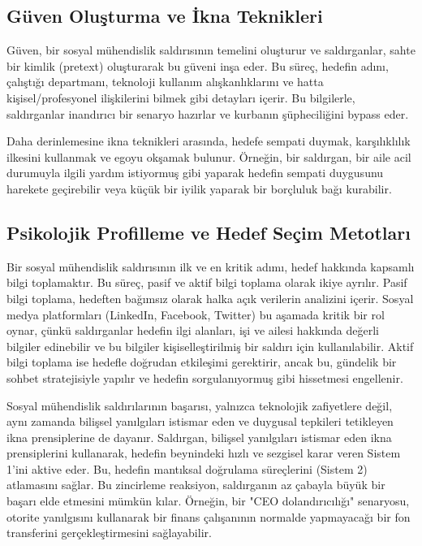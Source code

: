 \subsection{Güven Oluşturma ve İkna Teknikleri}

Güven, bir sosyal mühendislik saldırısının temelini oluşturur ve saldırganlar, sahte bir kimlik (pretext) oluşturarak bu güveni inşa eder. Bu süreç, hedefin adını, çalıştığı departmanı, teknoloji kullanım alışkanlıklarını ve hatta kişisel/profesyonel ilişkilerini bilmek gibi detayları içerir. Bu bilgilerle, saldırganlar inandırıcı bir senaryo hazırlar ve kurbanın şüpheciliğini bypass eder.

Daha derinlemesine ikna teknikleri arasında, hedefe sempati duymak, karşılıklılık ilkesini kullanmak ve egoyu okşamak bulunur. Örneğin, bir saldırgan, bir aile acil durumuyla ilgili yardım istiyormuş gibi yaparak hedefin sempati duygusunu harekete geçirebilir veya küçük bir iyilik yaparak bir borçluluk bağı kurabilir.

\subsection{Psikolojik Profilleme ve Hedef Seçim Metotları}

Bir sosyal mühendislik saldırısının ilk ve en kritik adımı, hedef hakkında kapsamlı bilgi toplamaktır. Bu süreç, pasif ve aktif bilgi toplama olarak ikiye ayrılır. Pasif bilgi toplama, hedeften bağımsız olarak halka açık verilerin analizini içerir. Sosyal medya platformları (LinkedIn, Facebook, Twitter) bu aşamada kritik bir rol oynar, çünkü saldırganlar hedefin ilgi alanları, işi ve ailesi hakkında değerli bilgiler edinebilir ve bu bilgiler kişiselleştirilmiş bir saldırı için kullanılabilir. Aktif bilgi toplama ise hedefle doğrudan etkileşimi gerektirir, ancak bu, gündelik bir sohbet stratejisiyle yapılır ve hedefin sorgulanıyormuş gibi hissetmesi engellenir.

Sosyal mühendislik saldırılarının başarısı, yalnızca teknolojik zafiyetlere değil, aynı zamanda bilişsel yanılgıları istismar eden ve duygusal tepkileri tetikleyen ikna prensiplerine de dayanır. Saldırgan, bilişsel yanılgıları istismar eden ikna prensiplerini kullanarak, hedefin beynindeki hızlı ve sezgisel karar veren Sistem 1'ini aktive eder. Bu, hedefin mantıksal doğrulama süreçlerini (Sistem 2) atlamasını sağlar. Bu zincirleme reaksiyon, saldırganın az çabayla büyük bir başarı elde etmesini mümkün kılar. Örneğin, bir "CEO dolandırıcılığı" senaryosu, otorite yanılgısını kullanarak bir finans çalışanının normalde yapmayacağı bir fon transferini gerçekleştirmesini sağlayabilir.

